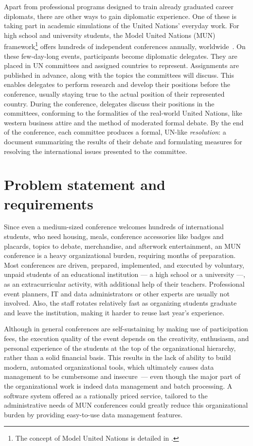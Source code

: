 Apart from professional programs designed to train already graduated career diplomats, there are other ways to gain diplomatic experience. One of these is taking part in academic simulations of the United Nations' everyday work. For high school and university students, the Model United Nations (MUN) framework\footnote{The concept of Model United Nations is detailed in .} offers hundreds of independent conferences annually, worldwide~\cite{mymunconferencelist}. On these few-day-long events, participants become diplomatic delegates. They are placed in UN committees and assigned countries to represent. Assignments are published in advance, along with the topics the committees will discuss. This enables delegates to perform research and develop their positions before the conference, usually staying true to the actual position of their represented country. During the conference, delegates discuss their positions in the committees, conforming to the formalities of the real-world United Nations, like western business attire and the method of moderated formal debate. By the end of the conference, each committee produces a formal, UN-like \emph{resolution}: a document summarizing the results of their debate and formulating measures for resolving the international issues presented to the committee.

\section{Problem statement and requirements}

Since even a medium-sized conference welcomes hundreds of international students, who need housing, meals, conference accessories like badges and placards, topics to debate, merchandise, and afterwork entertainment, an MUN conference is a heavy organizational burden, requiring months of preparation. Most conferences are driven, prepared, implemented, and executed by voluntary, unpaid students of an educational institution — a high school or a university —, as an extracurricular activity, with additional help of their teachers. Professional event planners, IT and data administrators or other experts are usually not involved. Also, the staff rotates relatively fast as organizing students graduate and leave the institution, making it harder to reuse last year's experience.

Although in general conferences are self-sustaining by making use of participation fees, the execution quality of the event depends on the creativity, enthusiasm, and personal experience of the students at the top of the organizational hierarchy, rather than a solid financial basis. This results in the lack of ability to build modern, automated organizational tools, which ultimately causes data management to be cumbersome and insecure — even though the major part of the organizational work is indeed data management and batch processing. A software system offered as a rationally priced service, tailored to the administrative needs of MUN conferences could greatly reduce this organizational burden by providing easy-to-use data management features.

